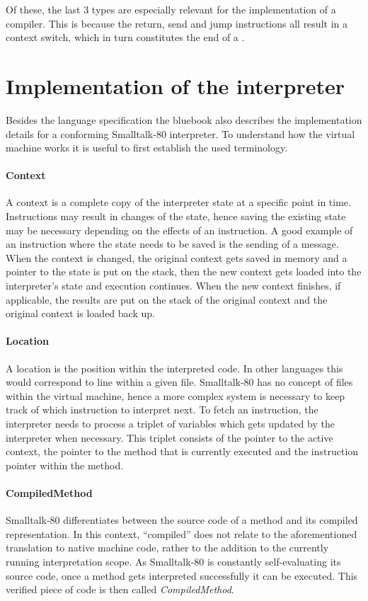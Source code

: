 Of these, the last 3 types are especially relevant for the implementation of a \jit{} compiler. 
This is because the return, send and jump instructions all result in a context switch, which in turn constitutes the end of a \bb{}.

\section{Implementation of the interpreter}
Besides the language specification the bluebook also describes the implementation details for a conforming Smalltalk-80 interpreter. 
To understand how the virtual machine works it is useful to first establish the used terminology. 

\paragraph{Context}
A context is a complete copy of the interpreter state at a specific point in time. Instructions may result in changes of the state, hence saving the existing state may be necessary depending on the effects of an instruction. 
A good example of an instruction where the state needs to be saved is the sending of a message. 
When the context is changed, the original context gets saved in memory and a pointer to the state is put on the stack, then the new context gets loaded into the interpreter's state and execution continues. When the new context finishes, if applicable, the results are put on the stack of the original context and the original context is loaded back up.

\paragraph{Location} 
A location is the position within the interpreted code. In other languages this would correspond to line within a given file.
Smalltalk-80 has no concept of files within the virtual machine, hence a more complex system is necessary to keep track of which instruction to interpret next.
To fetch an instruction, the interpreter needs to process a triplet of variables which gets updated by the interpreter when necessary. 
This triplet consists of the pointer to the active context, the pointer to the method that is currently executed and the instruction pointer within the method.

\paragraph{CompiledMethod}
Smalltalk-80 differentiates between the source code of a method and its compiled representation. In this context, \enquote{compiled} does not relate to the aforementioned translation to native machine code, rather to the addition to the currently running interpretation scope. As Smalltalk-80 is constantly self-evaluating its source code, once a method gets interpreted successfully it can be executed. This verified piece of code is then called \emph{CompiledMethod}.

